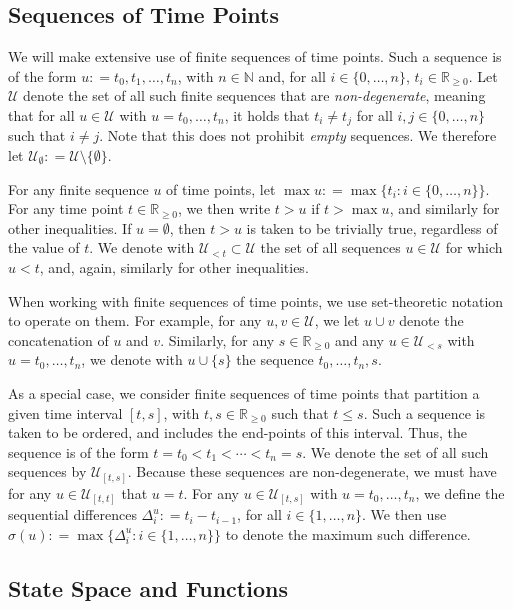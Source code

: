 \documentclass[10pt,a4paper]{paper}
\theoremstyle{definition}
\newcommand{\nats}{\mathbb{N}}
\newcommand{\reals}{\mathbb{R}}
\newcommand{\realsnonneg}{\reals_{\geq 0}}
\newcommand{\coloneqq}{:\!=}
\begin{document}
\subsection{Sequences of Time Points}

We will make extensive use of finite sequences of time points. Such a sequence is of the form $u\coloneqq t_0,t_1,\ldots,t_n$, with $n\in\nats$ and, for all $i\in\{0,\ldots,n\}$, $t_i\in\realsnonneg$. Let $\mathcal{U}$ denote the set of all such finite sequences that are \emph{non-degenerate}, meaning that for all $u\in\mathcal{U}$ with $u=t_0,\ldots,t_n$, it holds that $t_i\neq t_j$ for all $i,j\in\{0,\ldots,n\}$ such that $i\neq j$. Note that this does not prohibit \emph{empty} sequences. We therefore let $\mathcal{U}_\emptyset\coloneqq \mathcal{U}\setminus\{\emptyset\}$.

For any finite sequence $u$ of time points, let $\max u\coloneqq \max\{t_i:i\in\{0,\ldots,n\}\}$. For any time point $t\in\realsnonneg$, we then write $t>u$ if $t>\max u$, and similarly for other inequalities. If $u=\emptyset$, then $t>u$ is taken to be trivially true, regardless of the value of $t$. We denote with $\mathcal{U}_{<t}\subset\mathcal{U}$ the set of all sequences $u\in\mathcal{U}$ for which $u<t$, and, again, similarly for other inequalities.

When working with finite sequences of time points, we use set-theoretic notation to operate on them. For example, for any $u,v\in\mathcal{U}$, we let $u\cup v$ denote the concatenation of $u$ and $v$. Similarly, for any $s\in\realsnonneg$ and any $u\in\mathcal{U}_{<s}$ with $u=t_0,\ldots,t_n$, we denote with $u\cup\{s\}$ the sequence $t_0,\ldots,t_n,s$.

As a special case, we consider finite sequences of time points that partition a given time interval $[t,s]$, with $t,s\in\realsnonneg$ such that $t\leq s$. Such a sequence is taken to be ordered, and includes the end-points of this interval.  Thus, the sequence is of the form $t=t_0< t_1<\cdots< t_n=s$. We denote the set of all such sequences by $\mathcal{U}_{[t,s]}$. Because these sequences are non-degenerate, we must have for any $u\in\mathcal{U}_{[t,t]}$ that $u=t$. For any $u\in\mathcal{U}_{[t,s]}$ with $u=t_0,\ldots,t_n$, we define the sequential differences $\Delta_i^u\coloneqq t_i-t_{i-1}$, for all $i\in\{1,\ldots,n\}$. We then use $\sigma(u)\coloneqq \max\{\Delta_i^u:i\in\{1,\ldots,n\}\}$ to denote the maximum such difference.

\subsection{State Space and Functions}\label{sec:multivar_notation}
\end{document}
